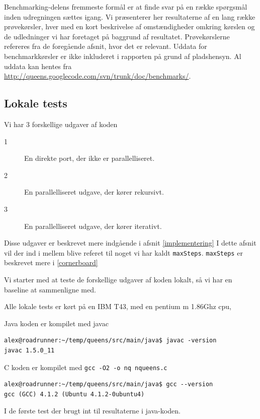 Benchmarking-delens fremmeste formål er at finde svar på en række spørgsmål
inden udregningen sættes igang. Vi præsenterer her resultaterne af en lang række prøvekørsler, hver med en kort beskrivelse af omstændigheder omkring kørslen og de udledninger vi har foretaget på baggrund af resultatet. Prøvekørslerne refereres fra de foregående afsnit, hvor det er relevant. Uddata for benchmarkkørsler er ikke inkluderet i rapporten på grund af pladshensyn. Al uddata kan hentes fra \url{http://queens.googlecode.com/svn/trunk/doc/benchmarks/}.

\subsection{Lokale tests}

Vi har 3 forskellige udgaver af koden
\begin{description}
\item[1] En direkte port, der ikke er parallelliseret.
\item[2] En parallelliseret udgave, der kører rekursivt.
\item[3] En parallelliseret udgave, der kører iterativt.
\end{description}

Disse udgaver er beskrevet mere indgående i afsnit \ref{implementering}
I dette afsnit vil der ind i mellem blive referet til noget vi har kaldt
\texttt{maxSteps}. \texttt{maxSteps} er beskrevet mere i \ref{cornerboard} 

Vi starter med at teste de forskellige udgaver af koden lokalt, så vi har en
baseline at sammenligne med.

Alle lokale tests er kørt på en IBM T43, med en pentium m 1.86Ghz cpu, 

Java koden er kompilet med javac

\begin{verbatim}
alex@roadrunner:~/temp/queens/src/main/java$ javac -version
javac 1.5.0_11
\end{verbatim}

C koden er kompilet med \texttt{gcc -O2 -o nq nqueens.c}

\begin{verbatim}
alex@roadrunner:~/temp/queens/src/main/java$ gcc --version
gcc (GCC) 4.1.2 (Ubuntu 4.1.2-0ubuntu4)
\end{verbatim}

I de første test der brugt int til resultaterne i java-koden. 

